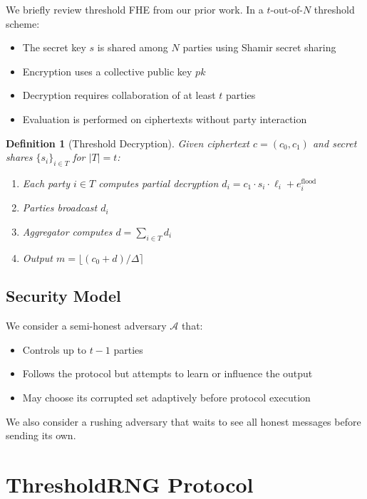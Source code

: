 \documentclass[11pt,a4paper]{article}
\newtheorem{definition}[theorem]{Definition}
\begin{document}
We briefly review threshold FHE from our prior work. In a $t$-out-of-$N$ threshold scheme:
\begin{itemize}
    \item The secret key $s$ is shared among $N$ parties using Shamir secret sharing
    \item Encryption uses a collective public key $pk$
    \item Decryption requires collaboration of at least $t$ parties
    \item Evaluation is performed on ciphertexts without party interaction
\end{itemize}

\begin{definition}[Threshold Decryption]
Given ciphertext $c = (c_0, c_1)$ and secret shares $\{s_i\}_{i \in T}$ for $|T| = t$:
\begin{enumerate}
    \item Each party $i \in T$ computes partial decryption $d_i = c_1 \cdot s_i \cdot \ell_i + e_i^{\text{flood}}$
    \item Parties broadcast $d_i$
    \item Aggregator computes $d = \sum_{i \in T} d_i$
    \item Output $m = \lfloor (c_0 + d) / \Delta \rceil$
\end{enumerate}
\end{definition}

\subsection{Security Model}

We consider a semi-honest adversary $\mathcal{A}$ that:
\begin{itemize}
    \item Controls up to $t-1$ parties
    \item Follows the protocol but attempts to learn or influence the output
    \item May choose its corrupted set adaptively before protocol execution
\end{itemize}

We also consider a rushing adversary that waits to see all honest messages before sending its own.

\section{ThresholdRNG Protocol}
\end{document}
